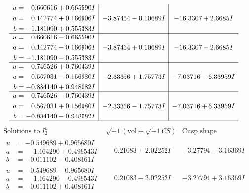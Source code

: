 \documentclass[1p]{elsarticle_modified}
\theoremstyle{definition}
\newcommand{\I}{\sqrt{-1}}
\begin{document}
$$\begin{array}{c|c|c}
\begin{aligned}
u &= \phantom{-}0.660616 + 0.665590 I \\
a &= \phantom{-}0.142774 + 0.166906 I \\
b &= -1.181090 + 0.555383 I\end{aligned}
 & -3.87464 - 0.10689 I & -16.3307 + 2.6685 I \\ \hline\begin{aligned}
u &= \phantom{-}0.660616 - 0.665590 I \\
a &= \phantom{-}0.142774 - 0.166906 I \\
b &= -1.181090 - 0.555383 I\end{aligned}
 & -3.87464 + 0.10689 I & -16.3307 - 2.6685 I \\ \hline\begin{aligned}
u &= \phantom{-}0.746526 + 0.760439 I \\
a &= \phantom{-}0.567031 - 0.156980 I \\
b &= -0.884140 + 0.948082 I\end{aligned}
 & -2.33356 + 1.75773 I & -7.03716 - 6.33959 I \\ \hline\begin{aligned}
u &= \phantom{-}0.746526 - 0.760439 I \\
a &= \phantom{-}0.567031 + 0.156980 I \\
b &= -0.884140 - 0.948082 I\end{aligned}
 & -2.33356 - 1.75773 I & -7.03716 + 6.33959 I\\
 \hline 
 \end{array}$$\newpage$$\begin{array}{c|c|c}  
\text{Solutions to }I^u_{2}& \I (\text{vol} + \sqrt{-1}CS) & \text{Cusp shape}\\
 \hline 
\begin{aligned}
u &= -0.549689 + 0.965680 I \\
a &= \phantom{-}1.164290 + 0.499543 I \\
b &= -0.011102 - 0.408161 I\end{aligned}
 & \phantom{-}0.21083 + 2.02252 I & -3.27794 - 3.16369 I \\ \hline\begin{aligned}
u &= -0.549689 - 0.965680 I \\
a &= \phantom{-}1.164290 - 0.499543 I \\
b &= -0.011102 + 0.408161 I\end{aligned}
 & \phantom{-}0.21083 - 2.02252 I & -3.27794 + 3.16369 I \\ \hline\begin{aligned}

\end{aligned}
\end{array}$$
\end{document}
